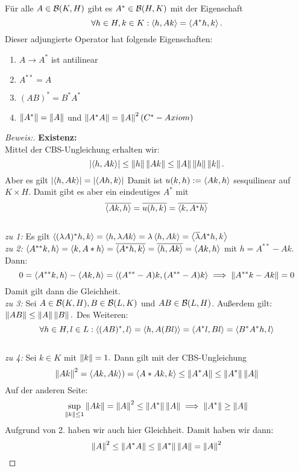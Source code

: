 \begin{theorem}
	Für alle $A \in \B(K, H)$ gibt es $A^* \in \B(H, K)$ mit der Eigenschaft \[\forall h \in H, k \in K: \ip{h, Ak} = \ip{A^*h, k}.\] Dieser adjungierte Operator hat folgende Eigenschaften:

	\begin{enumerate}
		\item $A \to A^*$ ist antilinear
		\item $A^{**} = A$
		\item $(AB)^{*} = B^*A^*$
		\item $\norm{A^*} = \norm{A}$ und $\norm{A^*A} = \norm{A}^2 (C^*-Axiom)$
	\end{enumerate}

	\begin{proof}[Beweis:] \textbf{Existenz:} \\
		Mittel der CBS-Ungleichung erhalten wir: \[\ab{\ip{h, Ak}} \leq \norm{h}\norm{Ak} \leq \norm{A}\norm{h}\norm{k}.\] Aber es gilt $\ab{\ip{h, Ak}} = \ab{\ip{Ah, k}} $ Damit ist $u(k, h) := \ip{Ak, h}$ sesquilinear auf $K \times H.$ Damit gibt es aber ein eindeutiges $A^*$ mit \[\overline{\ip{Ak, h}} = \overline{u(h, k)} = \overline{\ip{k, A^*h}}\] \\
\textit{zu 1:} Es gilt \(\ip{(\lambda A)^*h, k} = \ip{h, \lambda A k} = \lambda \ip{h, Ak}= \ip{\overline{\lambda}A^*h, k}\)\\
\textit{zu 2:} \(\ip{A^{**}k, h} = \ip{k, A*h} = \overline{\ip{A^{*}h, k}} = \overline{{\ip{h, Ak}}} = \ip{Ak, h}\) mit $h = A^{**}-Ak.$ Dann: \[0 = \ip{A^{**}k, h} - \ip{Ak, h} = \ip{(A^{**}-A)k, (A^{**}-A)k} \implies \norm{A^{**}k - Ak} = 0\] Damit gilt dann die Gleichheit. \\
	\textit{zu 3:} Sei $A \in \B(K, H), B \in \B(L, K)$ und $AB \in \B(L, H)$. Außerdem gilt: $\norm{AB} \leq \norm{A}\norm{B}.$ Des Weiteren: \[\forall h \in H, l \in L: \ip{(AB)^*, l}= \ip{h, A(Bl)} = \ip{A^*l, Bl} = \ip{B^*A^*h, l}\] \\
	\textit{zu 4:} Sei $k \in K$ mit $\norm{k} = 1.$ Dann gilt mit der CBS-Ungleichung \[\norm{Ak}^2 = \ip{Ak, Ak}) = \ip{A*Ak, k} \leq \norm{A^*A} \leq \norm{A^*} \norm{A}\]
Auf der anderen Seite: \[ \sup_{\norm{k} \leq 1} \norm{Ak} = \norm{A}^2 \leq \norm{A^*} \norm{A} \implies \norm{A^*} \geq \norm{A}\] Aufgrund von 2. haben wir auch hier Gleichheit. Damit haben wir dann: \[\norm{A}^2 \leq \norm{A^*A} \leq \norm{A^*}\norm{A} = \norm{A}^2\]
\end{proof}
\end{theorem}


